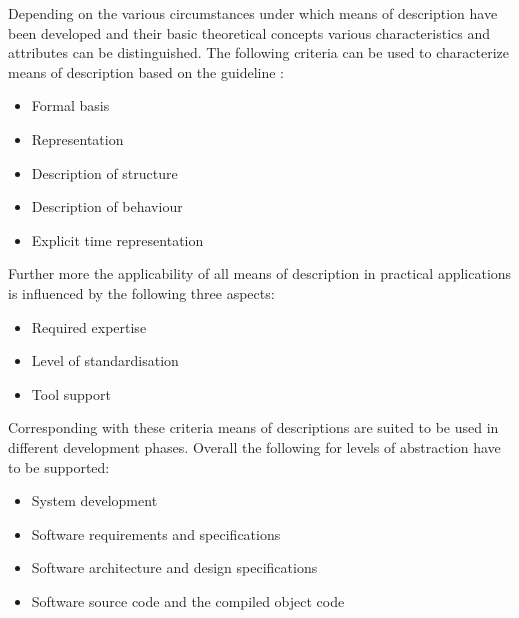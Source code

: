 \documentclass{./template/openetcs_report}
\begin{document}
Depending  on the various circumstances under which means of description have been developed and their basic theoretical concepts various characteristics and attributes can be distinguished.  The following  criteria can be used to characterize  means of description based on the guideline \citeauthor{VDIVDE3681}:
\vspace{-10pt}
\begin{itemize}[topsep=2pt, partopsep=2pt,itemsep=2pt,parsep=2pt]
  \item Formal basis
  \item Representation
  \item Description of structure
  \item Description of behaviour
  \item Explicit time representation
\end{itemize}
Further more the applicability of all means of description in practical applications is influenced by the following three aspects:

\vspace{-10pt}
\begin{itemize}[topsep=2pt, partopsep=2pt,itemsep=2pt,parsep=2pt]
  \item Required expertise
  \item Level of standardisation
  \item Tool support
\end{itemize}


Corresponding with these criteria means of descriptions are suited to be used in different development phases. Overall the following for levels of abstraction have to be supported:

\vspace{-10pt}
\begin{itemize}[topsep=2pt, partopsep=2pt,itemsep=2pt,parsep=2pt]
  \item System development
  \item Software requirements and specifications
  \item Software architecture and design specifications
  \item Software source code and the compiled object code
\end{itemize}
\end{document}
